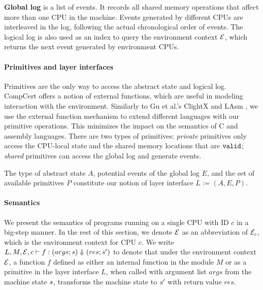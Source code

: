{\textbf{Global log} 
is a list of events. It records all shared memory operations that affect more than
one CPU in the machine. Events generated by different CPUs are
interleaved in the log, following the actual chronological order of events.
The logical log is also used as an index to query the environment context
$\mathcal{E}$, which returns the next event  generated by 
environment CPUs.


\paragraph{Primitives and layer interfaces}
Primitives are the only way to access the abstract state and
logical log. CompCert offers a notion of external
functions, which are useful in modeling interaction with the environment.
Similarly to Gu et al.'s ClightX and LAsm \cite[\S 4, \S 5]{dscal15}, we use the external function mechanism to extend different languages with our primitive operations. This minimizes the impact on the semantics of C and assembly languages.
There are two types of primitives:
\emph{private} primitives only access the CPU-local state
and the shared memory locations that are ${\texttt{valid}}$;
\emph{shared} primitives can access the global log
and generate events.


The type of abstract state $A$, potential events of the global log
$E$,
and the set of available primitives $P$ constitute our notion of layer
interface $L := (A, E, P)$.

\paragraph{Semantics}
We present the semantics of programs running on a single CPU with ID $c$ in
a big-step manner.
In the rest of this section,
we denote $\mathcal{E}$ as an abbreviation
of $\mathcal{E}_c$, which is the environment context
for CPU $c$.
We write $ L, M, \mathcal{E}, c \vdash f : (args;s) \Downarrow (res;s')$ to denote
that under the environment context $\mathcal{E}$, a function $f$ defined as either
an internal function in the module $M$ or as a primitive in the layer interface $L$,
when called with argument list $args$ from the machine state $s$, transforms
the machine state to $s'$ with return value ${res}$.

}
